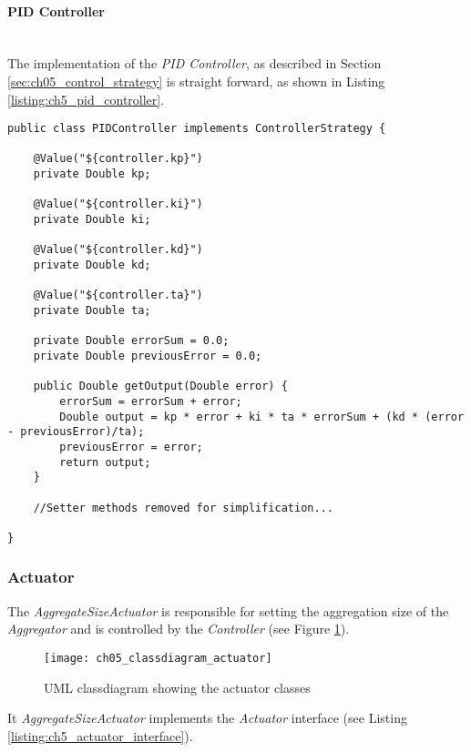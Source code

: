 \paragraph{PID Controller}\mbox{}\\

The implementation of the \emph{PID Controller}, as described in Section \ref{sec:ch05_control_strategy} is straight forward, as shown in Listing \ref{listing:ch5_pid_controller}.

\begin{lstlisting}[caption={Implementation of PID Controller},label=listing:ch5_pid_controller]
public class PIDController implements ControllerStrategy {
	
	@Value("${controller.kp}")
	private Double kp;
	
	@Value("${controller.ki}")
	private Double ki;
	
	@Value("${controller.kd}")
	private Double kd;
	
	@Value("${controller.ta}")
	private Double ta;
	
	private Double errorSum = 0.0;
	private Double previousError = 0.0;

	public Double getOutput(Double error) {
		errorSum = errorSum + error;
		Double output = kp * error + ki * ta * errorSum + (kd * (error - previousError)/ta);
		previousError = error;
		return output;
	}

	//Setter methods removed for simplification...

}

\end{lstlisting}

\subsubsection{Actuator}
\label{sec:ch05_actuator}

The \emph{AggregateSizeActuator} is responsible for setting the aggregation size of the \emph{Aggregator} and is controlled by the \emph{Controller} (see Figure \ref{fig:ch05_classdiagram_actuator}).

\begin{figure}[htbp]
	\centering
	\texttt{[image: ch05\_classdiagram\_actuator]}
	\caption{\ac{UML} classdiagram showing the actuator classes}
	\label{fig:ch05_classdiagram_actuator}
\end{figure}

It \emph{AggregateSizeActuator} implements the \emph{Actuator} interface (see Listing \ref{listing:ch5_actuator_interface}). 

